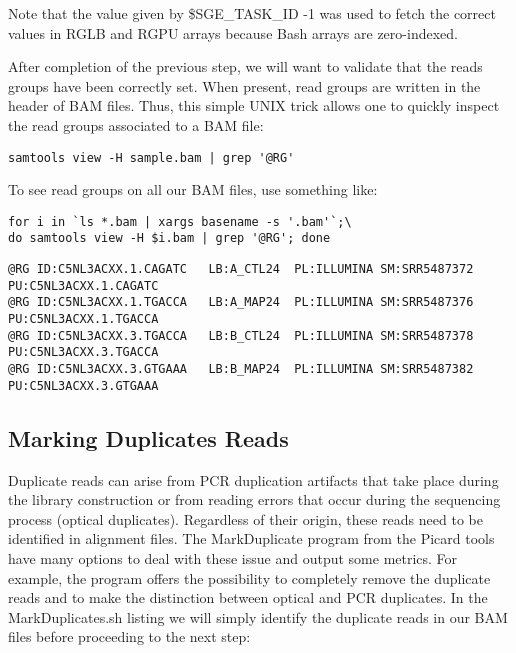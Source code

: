 Note that the value given by \$SGE\_TASK\_ID -1 was used to fetch the correct values in RGLB and RGPU arrays because Bash arrays are zero-indexed.

After completion of the previous step, we will want to validate that the reads groups have been correctly set. When present, read groups are written in the header of BAM files. Thus, this simple UNIX trick allows one to quickly inspect the read groups associated to a BAM file:

\begin{verbatim}
samtools view -H sample.bam | grep '@RG'	
\end{verbatim}


To see read groups on all our BAM files, use something like:

\begin{verbatim}
for i in `ls *.bam | xargs basename -s '.bam'`;\
do samtools view -H $i.bam | grep '@RG'; done
\end{verbatim}

\begin{small}
\begin{verbatim}
@RG	ID:C5NL3ACXX.1.CAGATC	LB:A_CTL24	PL:ILLUMINA	SM:SRR5487372	PU:C5NL3ACXX.1.CAGATC
@RG	ID:C5NL3ACXX.1.TGACCA	LB:A_MAP24	PL:ILLUMINA	SM:SRR5487376	PU:C5NL3ACXX.1.TGACCA
@RG	ID:C5NL3ACXX.3.TGACCA	LB:B_CTL24	PL:ILLUMINA	SM:SRR5487378	PU:C5NL3ACXX.3.TGACCA
@RG	ID:C5NL3ACXX.3.GTGAAA	LB:B_MAP24	PL:ILLUMINA	SM:SRR5487382	PU:C5NL3ACXX.3.GTGAAA
\end{verbatim}
\end{small}






\subsection{Marking Duplicates Reads}


Duplicate reads can arise from PCR duplication artifacts that take place during the library construction or from reading errors that occur during the sequencing process (optical duplicates). Regardless of their origin, these reads need to be identified in alignment files. The MarkDuplicate program from the Picard tools have many options to deal with these issue and output some metrics. For example, the program offers the possibility to completely remove the duplicate reads and to make the distinction between optical and PCR duplicates. In the MarkDuplicates.sh listing we will simply identify the duplicate reads in our BAM files before proceeding to the next step:

